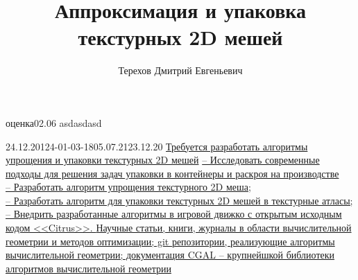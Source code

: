 \documentclass{fefu_thesis/cls/fefu}
\author{Терехов Дмитрий Евгеньевич}
\title{Аппроксимация и упаковка текстурных 2D мешей}
\begin{document}
    \makethesistitlebackside
    \begin{review}{оценка}{02.06}
        asdasdasd
    \end{review}
    \begin{thesistask}{24.12.20}{124-01-03-18}{05.07.21}{23.12.20}
        \taskitem \uline{Требуется разработать алгоритмы упрощения и упаковки текстурных 2D мешей\hfill\null}
        \taskitem \uline{
            -- Исследовать современные подходы для решения задач упаковки в контейнеры и раскроя на производстве\hfill\null\\-- Разработать алгоритм упрощения текстурного 2D меша;\hfill\null\\-- Разработать алгоритм для упаковки текстурных 2D мешей в текстурные атласы;\hfill\null\\-- Внедрить разработанные алгоритмы в игровой движко с открытым исходным кодом <<Citrus>>.\hfill\null
        }
        \taskitem \uline{
            Научные статьи, книги, журналы в области вычислительной геометрии и методов оптимизации; git репозитории, реализующие алгоритмы вычислительной геометрии; документация CGAL -- крупнейшкой библиотеки алгоритмов вычислительной геометрии\hfill\null
        }
    \end{thesistask}
\end{document}
